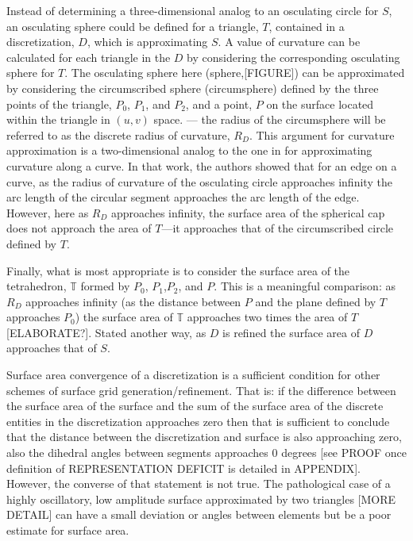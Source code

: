Instead of determining a three-dimensional analog to an osculating
circle for $S$, an osculating sphere could be defined for a triangle,
$T$, contained in a discretization, $D$, which is approximating $S$. A
value of curvature can be calculated for each triangle in the $D$ by
considering the corresponding osculating sphere for $T$. The osculating
sphere here (sphere,[FIGURE]) can be approximated by considering the
circumscribed sphere (circumsphere) \cite{casey1888} defined by the
three points of the triangle, $P_0$, $P_1$, and $P_2$, and a point, $P$
on the surface located within the triangle in $(u,v)$ space. --- the
radius of the circumsphere will be referred to as the discrete radius of
curvature, $R_D$. This argument for curvature approximation is a
two-dimensional analog to the one in \cite{mclaurin12} for approximating
curvature along a curve. In that work, the authors showed that for an
edge on a curve, as the radius of curvature of the osculating circle
approaches infinity the arc length of the circular segment approaches
the arc length of the edge. However, here as $R_D$ approaches infinity,
the surface area of the spherical cap does not approach the area of
$T$---it approaches that of the circumscribed circle defined by $T$.

Finally, what is most appropriate is to consider the surface area of the
tetrahedron, ${\mathbb T}$ formed by $P_0$, $P_1$,$P_2$, and $P$. This
is a meaningful comparison: as $R_D$ approaches infinity (as the
distance between $P$ and the plane defined by $T$ approaches $P_0$) the
surface area of ${\mathbb T}$ approaches two times the area of
$T$[ELABORATE?].
Stated another way, as $D$ is refined the surface area of $D$ approaches
that of $S$.

Surface area convergence of a discretization is a sufficient condition
for other schemes of surface grid generation/refinement. That is: if the
difference between the surface area of the surface and the sum of the
surface area of the discrete entities in the discretization approaches
zero then that is sufficient to conclude that the distance between the
discretization and surface is also approaching zero, also the dihedral
angles between segments approaches $0$ degrees [see PROOF once
definition of REPRESENTATION DEFICIT is detailed in APPENDIX]. However,
the converse of that statement is not true. The pathological case of a
highly oscillatory, low amplitude surface approximated by two triangles
[MORE DETAIL] can have a small deviation or angles between elements
but be a poor estimate for surface area.
